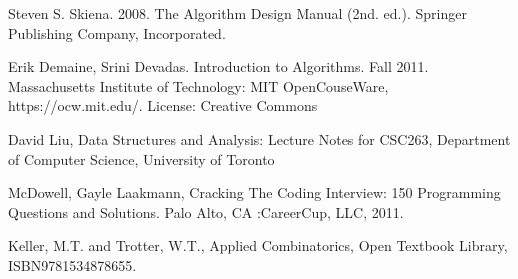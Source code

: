 \documentclass{article}
\begin{document}
    
    




\begin{thebibliography}{}
\bibitem{}
Steven S. Skiena. 2008. The Algorithm Design Manual (2nd. ed.). Springer Publishing Company, Incorporated.

\bibitem[]{}
Erik Demaine, Srini Devadas. Introduction to Algorithms. Fall 2011. Massachusetts Institute of Technology: MIT OpenCouseWare, https://ocw.mit.edu/. License: Creative Commons

\bibitem{}
David Liu, Data Structures and Analysis: Lecture Notes for CSC263, Department of Computer Science, University of Toronto

\bibitem{}
McDowell, Gayle Laakmann, Cracking The Coding Interview: 150 Programming Questions and Solutions. Palo Alto, CA :CareerCup, LLC, 2011.

\bibitem{}
Keller, M.T. and Trotter, W.T., Applied Combinatorics, Open Textbook Library, ISBN9781534878655.
\end{thebibliography}
\end{document}
